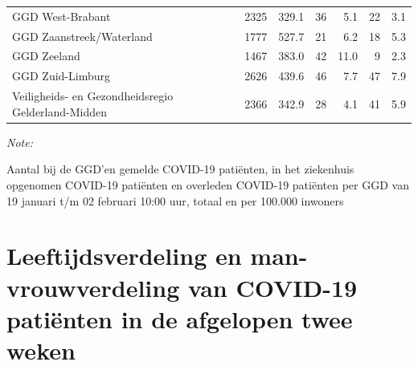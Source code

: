 \documentclass[
  english,
  man,floatsintext]{apa6}
\begin{document}
\begin{table}[H]
\begin{threeparttable}
\begin{tabular}{lrrrrrr}
GGD West-Brabant & 2325 & 329.1 & 36 & 5.1 & 22 & 3.1\\
GGD Zaanstreek/Waterland & 1777 & 527.7 & 21 & 6.2 & 18 & 5.3\\
GGD Zeeland & 1467 & 383.0 & 42 & 11.0 & 9 & 2.3\\
GGD Zuid-Limburg & 2626 & 439.6 & 46 & 7.7 & 47 & 7.9\\
Veiligheids- en Gezondheidsregio Gelderland-Midden & 2366 & 342.9 & 28 & 4.1 & 41 & 5.9\\
\bottomrule
\end{tabular}
\begin{tablenotes}
\item \textit{Note: } 
\item Aantal bij de GGD’en gemelde COVID-19 patiënten, in het ziekenhuis opgenomen COVID-19 patiënten en overleden COVID-19 patiënten per GGD van 19 januari t/m 02 februari 10:00 uur, totaal en per 100.000 inwoners
\end{tablenotes}
\end{threeparttable}
\endgroup{}
\end{table}

\newpage

\hypertarget{leeftijdsverdeling-en-man-vrouwverdeling-van-covid-19-patiuxebnten-in-de-afgelopen-twee-weken}{%
\section{Leeftijdsverdeling en man-vrouwverdeling van COVID-19 patiënten in de afgelopen twee weken}\label{leeftijdsverdeling-en-man-vrouwverdeling-van-covid-19-patiuxebnten-in-de-afgelopen-twee-weken}}
\end{document}
